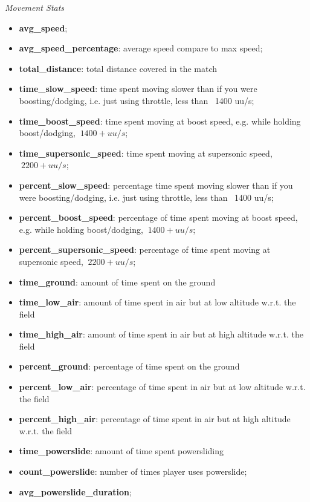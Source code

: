 \begin{center}
    \textit{Movement Stats}
\end{center}
\begin{itemize}
    \item \textbf{avg\_speed};
    \item \textbf{avg\_speed\_percentage}: average speed compare to max speed;
    \item \textbf{total\_distance}: total distance covered in the match
    \item \textbf{time\_slow\_speed}:  time spent moving slower than if you were boosting/dodging, i.e. just using throttle, less than ~1400 uu/s;
    \item \textbf{time\_boost\_speed}: time spent moving at boost speed, e.g. while holding boost/dodging, $~1400+ uu/s$; \\
    \item \textbf{time\_supersonic\_speed}: time spent moving at supersonic speed, $~ 2200+ uu/s$; \\
    \item \textbf{percent\_slow\_speed}: percentage time spent moving slower than if you were boosting/dodging, i.e. just using throttle, less than ~1400 uu/s;
    \item \textbf{percent\_boost\_speed}: percentage of time spent moving at boost speed, e.g. while holding boost/dodging, $~1400+ uu/s$; \\
    \item \textbf{percent\_supersonic\_speed}: percentage of time spent moving at supersonic speed, $~ 2200+ uu/s$; \\
    \item \textbf{time\_ground}: amount of time spent on the ground
    \item \textbf{time\_low\_air}: amount of time spent in air but at low altitude w.r.t. the field
    \item \textbf{time\_high\_air}: amount of time spent in air but at high altitude w.r.t. the field
    \item \textbf{percent\_ground}: percentage of time spent on the ground
    \item \textbf{percent\_low\_air}: percentage of time spent in air but at low altitude w.r.t. the field
    \item \textbf{percent\_high\_air}: percentage of time spent in air but at high altitude w.r.t. the field
    \item \textbf{time\_powerslide}: amount of time spent powersliding
    \item \textbf{count\_powerslide}: number of times player uses powerslide;
    \item \textbf{avg\_powerslide\_duration};
\end{itemize}
